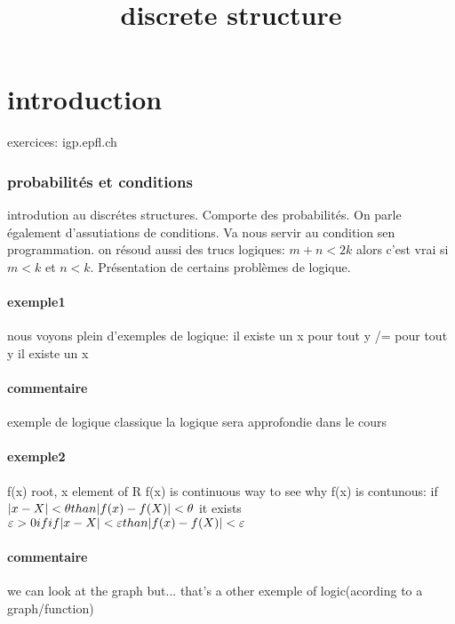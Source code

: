 \documentclass[a4paper,10pt]{article}
\title{discrete structure}
\author{}
\begin{document}
\maketitle

\part{introduction}
exercices: igp.epfl.ch

\section{probabilités et conditions}

introdution au discrétes structures. Comporte des probabilités. On parle également d'assutiations de conditions. Va nous servir au condition sen programmation.
on résoud aussi des trucs logiques: $m+n < 2k$ alors c'est vrai si $m<k$ et $n<k$. Présentation de certains problèmes de logique.
\subsection{exemple1}
nous voyons plein d'exemples de logique:
\newline
 il existe un x pour tout y /= pour tout y il existe un x
\subsection{commentaire}
exemple de logique classique
\newline
la logique sera approfondie dans le cours
\subsection{exemple2}
f(x) root, x element of R
\newline
f(x) is continuous
way to see why f(x) is contunous: if $|x-X| < \theta\\ than |f(x) -f(X)| < \theta$
it exists $\varepsilon >0 if if |x-X| < \varepsilon\\ than |f(x) -f(X)| < \varepsilon$
\subsection{commentaire}
we can look at the graph but... that's a other exemple of logic(acording to a graph/function)
\end{document}
